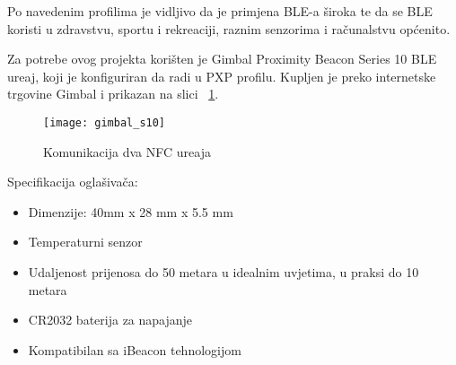 Po navedenim profilima je vidljivo da je primjena BLE-a \v{s}iroka te da se BLE koristi u zdravstvu, sportu i rekreaciji, raznim senzorima i ra\v{c}unalstvu op\'{c}enito.

Za potrebe ovog projekta kori\v{s}ten je Gimbal Proximity Beacon Series 10 BLE ure\dj aj, koji je konfiguriran da radi u PXP profilu. Kupljen je preko internetske trgovine Gimbal \cite{gimbal_beacon} i prikazan na slici ~\ref{fig:gimbal_oglasivac}.

\begin{figure}[!htbp]
	\begin{center}
 \texttt{[image: gimbal\_s10]}
 \caption{Komunikacija dva NFC ure\dj aja}
 \label{fig:gimbal_oglasivac}
	\end{center}
\end{figure}

Specifikacija ogla\v{s}iva\v{c}a:


\begin{itemize}
	\item Dimenzije: 40mm x 28 mm x 5.5 mm
	\item Temperaturni senzor
	\item Udaljenost prijenosa do 50 metara u idealnim uvjetima, u praksi do 10 metara
	\item CR2032 baterija za napajanje
	\item Kompatibilan sa iBeacon tehnologijom

\end{itemize}









